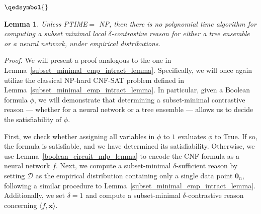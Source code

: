 \documentclass{article}
\newtheorem{lemma}{Lemma}
\newcommand{\x}{\textbf{x}}
\begin{document}
$\qedsymbol{}$


\begin{lemma}
\label{intract_subset_con_lemma}
Unless PTIME$=$ NP, then there is no polynomial time algorithm for computing a subset minimal local $\delta$-contrastive reason for either a tree ensemble or a neural network, under empirical distributions.
\end{lemma}

\emph{Proof.} We will present a proof analogous to the one in Lemma~\ref{subset_minimal_emp_intract_lemma}. Specifically, we will once again utilize the classical NP-hard CNF-SAT problem defined in  Lemma~\ref{subset_minimal_emp_intract_lemma}. In particular, given a Boolean formula $\phi$, we will demonstrate that determining a subset-minimal contrastive reason --- whether for a neural network or a tree ensemble --- allows us to decide the satisfiability of $\phi$. 



First, we check whether assigning all variables in $\phi$ to $1$ evaluates $\phi$ to True. If so, the formula is satisfiable, and we have determined its satisfiability. Otherwise, we use Lemma~\ref{boolean_circuit_mlp_lemma} to encode the CNF formula as a neural network $f$. Next, we compute a subset-minimal $\delta$-sufficient reason by setting $\mathcal{D}$ as the empirical distribution containing only a single data point $\mathbf{0}_n$, following a similar procedure to Lemma~\ref{subset_minimal_emp_intract_lemma}. Additionally, we set $\delta=1$ and compute a subset-minimal $\delta$-contrastive reason concerning $\langle f,\x\rangle$.

\end{document}
